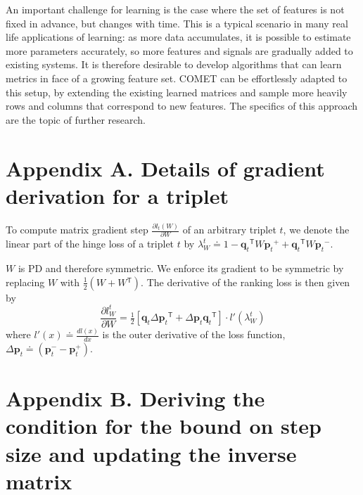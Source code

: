 \documentclass[twoside,11pt]{article}
\newcommand\mat[1]{{#1}}
\renewcommand\vec[1]{\mathbf{#1}}
\newcommand{\T}{{}^\mathsf{T}}
\newcommand{\W}{\mat{W}}
\newcommand{\eqdef}{\doteq}
\newcommand{\q}{{\vec{q}}}
\newcommand{\p}{{\vec{p}}}
\newcommand{\trip}{{t}}
\newcommand{\qt}{{\q_{\trip}}}
\newcommand{\pt}{{\p_{\trip}}}
\begin{document}
An important challenge for learning is the case where the set of features is not fixed in advance, but changes with time. This is a typical scenario in many real life applications of learning: as more data accumulates, it is possible to estimate more parameters accurately, so more features and signals are gradually added to existing systems. It is therefore desirable to develop algorithms that can learn metrics in face of a growing feature set. COMET can be effortlessly adapted to this setup, by extending the existing learned matrices and sample more heavily rows and columns that correspond to new features. The specifics of this approach are the topic of further research.


\newpage

\appendix
\section*{Appendix A. Details of gradient derivation for a triplet}
\label{appendix-grad}

To compute matrix gradient step $\frac{\partial {l_t (\W)}}{\partial \W}$ of an arbitrary triplet $t$, we denote the linear part of the hinge loss of a triplet $t$ by $\lambda_{W}^t \eqdef 
1-\qt\T \W \pt^{+} + \qt\T\W\pt^{-}.$

$\W$ is PD and therefore symmetric. We enforce its gradient to be symmetric by replacing $\W$ with $\tfrac{1}{2}(\W + \W\T)$.
The derivative of the ranking loss is then given by
\begin{equation}
\frac{\partial {l_{\W}^{t}}}{\partial \W} = \tfrac{1}{2}[\vec{q}_{t}\Delta\vec{p}_{t}\T  + \Delta\vec{p}_{t}\vec{q}_{t}\T]\cdot {l'}(\lambda_{W}^t)
\label{dlossranking}
\nonumber 
\end{equation} where $l'(x) \eqdef \frac{d{l(x)}}{dx}$ is the outer derivative of the loss function, $\Delta\vec{p}_{t} \eqdef (\vec{p}_{t}^{-} - \vec{p}_{t}^{+})$.

\section*{Appendix B. Deriving the condition for the bound on step size and updating the inverse matrix}
\label{appendix-inverse}
\end{document}
